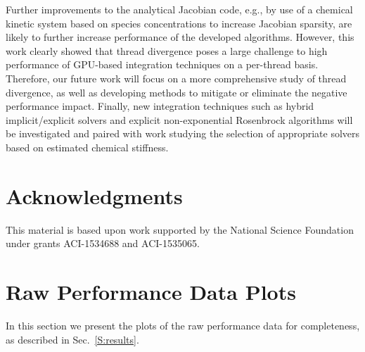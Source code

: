 \documentclass[final,twocolumn]{elsarticle}
\begin{document}
Further improvements to the analytical Jacobian code, e.g., by use of a chemical kinetic system based on species concentrations to increase Jacobian sparsity, are likely to further increase performance of the developed algorithms.
However, this work clearly showed that thread divergence poses a large challenge to high performance of GPU-based integration techniques on a per-thread basis.
Therefore, our future work will focus on a more comprehensive study of thread divergence, as well as developing methods to mitigate or eliminate the negative performance impact.
Finally, new integration techniques such as hybrid implicit\slash explicit solvers and explicit non-exponential Rosenbrock algorithms will be investigated and paired with work studying the selection of appropriate solvers based on estimated chemical stiffness.


\section*{Acknowledgments}
\ifmeasure
\addvspace{10pt}
\fi

This material is based upon work supported by the National Science Foundation under grants ACI-1534688 and ACI-1535065.

\appendix
\setcounter{figure}{0}

\renewcommand*{\thesection}{\appendixname~\Alph{section}}

\section{Raw Performance Data Plots}
\label{S:raw}

In this section we present the plots of the raw performance data for completeness, as described in Sec.~\ref{S:results}.
\end{document}
